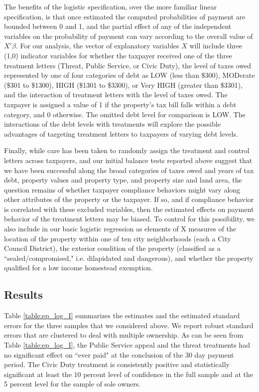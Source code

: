 \documentclass[12pt,titlepage]{article}
\begin{document}
The benefits of the logistic specification, over the more familiar
linear specification, is that once estimated the computed
probabilities of payment are bounded between 0 and 1, and the partial
effect of any of the independent variables on the probability of
payment can vary according to the overall value of $X'\beta$.  For our
analysis, the vector of explanatory variables $X$ will include three
(1,0) indicator variables for whether the taxpayer received one of the
three treatment letters (Threat, Public Service, or Civic Duty), the
level of taxes owed represented by one of four categories of debt as
LOW (less than \$300), MODerate (\$301 to \$1300), HIGH (\$1301 to
\$3300), or Very HIGH (greater than \$3301), and the interaction of
treatment letters with the level of taxes owed.  The taxpayer is
assigned a value of 1 if the property's tax bill falls within a debt
category, and 0 otherwise.  The omitted debt level for comparison is
LOW.  The interactions of the debt levels with treatments will explore
the possible advantages of targeting treatment letters to taxpayers of
varying debt levels.

Finally, while care has been taken to randomly assign the treatment
and control letters across taxpayers, and our initial balance tests
reported above suggest that we have been successful along the broad
categories of taxes owed and years of tax debt, property values and
property type, and property size and land area, the question remains
of whether taxpayer compliance behaviors might vary along other
attributes of the property or the taxpayer.  If so, and if compliance
behavior is correlated with these excluded variables, then the
estimated effects on payment behavior of the treatment letters may be
biased.  To control for this possibility, we also include in our basic
logistic regression as elements of X measures of the location of the
property within one of ten city neighborhoods (each a City Council
District), the exterior condition of the property (classified as a
``sealed/compromised," i.e. dilapidated and dangerous), and whether
the property qualified for a low income homestead exemption.  



\subsection{Results}
  
Table \ref{table:ep_log_I} summarizes the estimates and the estimated standard
errors for the three samples that we considered above. We report
robust standard errors that are clustered to deal with multiple
ownership. As can be seen from Table \ref{table:ep_log_I}, the Public Service appeal and
the threat treatments had no significant effect on ``ever paid" at the
conclusion of the 30 day payment period.  The Civic Duty treatment is
consistently positive and statistically significant at least the 10
percent level of confidence in the full sample and at the 5
percent level for the sample of sole owners.
\end{document}
